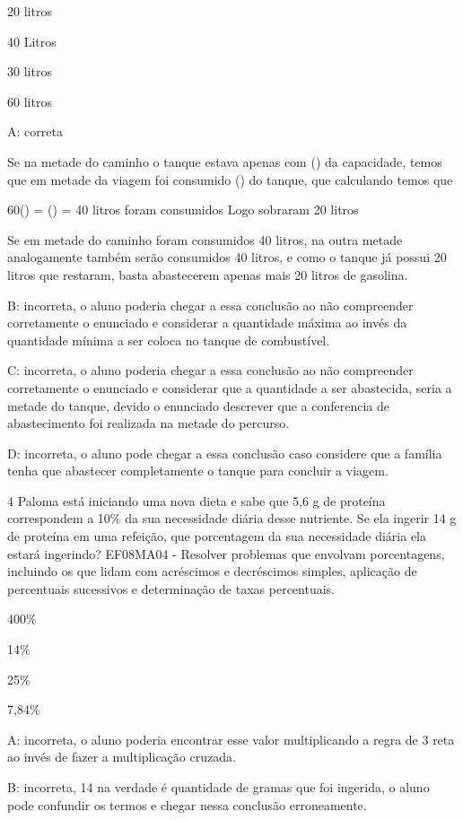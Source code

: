 \item 20 litros
\item 40 Litros
\item 30 litros
\item 60 litros

A: correta

Se na metade do caminho o tanque estava apenas com () da
capacidade, temos que em metade da viagem foi consumido ()
do tanque, que calculando temos que

60\times () = () = 40 litros foram consumidos
Logo sobraram 20 litros

Se em metade do caminho foram consumidos 40 litros, na outra metade
analogamente também serão consumidos 40 litros, e como o tanque já
possui 20 litros que restaram, basta abastecerem apenas mais 20 litros
de gasolina.

B: incorreta, o aluno poderia chegar a essa conclusão ao não compreender
corretamente o enunciado e considerar a quantidade máxima ao invés da
quantidade mínima a ser coloca no tanque de combustível.

C: incorreta, o aluno poderia chegar a essa conclusão ao não compreender
corretamente o enunciado e considerar que a quantidade a ser abastecida,
seria a metade do tanque, devido o enunciado descrever que a conferencia
de abastecimento foi realizada na metade do percurso.

D: incorreta, o aluno pode chegar a essa conclusão caso considere que a
família tenha que abastecer completamente o tanque para concluir a
viagem.

\num{4} Paloma está iniciando uma nova dieta e sabe que 5,6 g de proteína
correspondem a 10\% da sua necessidade diária desse nutriente. Se ela
ingerir 14 g de proteína em uma refeição, que porcentagem da sua
necessidade diária ela estará ingerindo? EF08MA04 - Resolver problemas
que envolvam porcentagens, incluindo os que lidam com acréscimos e
decréscimos simples, aplicação de percentuais sucessivos e determinação
de taxas percentuais.

\item 400\%
\item 14\%
\item 25\%
\item 7,84\%

A: incorreta, o aluno poderia encontrar esse valor multiplicando a regra
de 3 reta ao invés de fazer a multiplicação cruzada.

B: incorreta, 14 na verdade é quantidade de gramas que foi ingerida, o
aluno pode confundir os termos e chegar nessa conclusão erroneamente.

